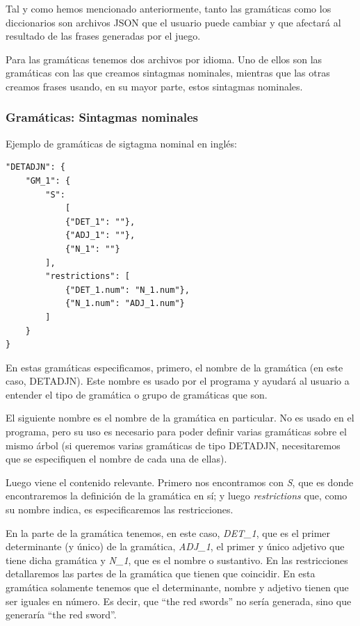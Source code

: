 Tal y como hemos mencionado anteriormente, tanto las gramáticas como los diccionarios son archivos JSON que el usuario puede cambiar y que afectará al resultado de las frases generadas por el juego.

Para las gramáticas tenemos dos archivos por idioma. Uno de ellos son las gramáticas con las que creamos sintagmas nominales, mientras que las otras creamos frases usando, en su mayor parte, estos sintagmas nominales.

\subsubsection{Gramáticas: Sintagmas nominales}

Ejemplo de gramáticas de sigtagma nominal en inglés:

\begin{lstlisting}[style=json]
"DETADJN": {
    "GM_1": {
        "S": 
            [
            {"DET_1": ""}, 
            {"ADJ_1": ""}, 
            {"N_1": ""}
        ],
        "restrictions": [
            {"DET_1.num": "N_1.num"},
            {"N_1.num": "ADJ_1.num"}
        ]
    }
}
\end{lstlisting}

En estas gramáticas especificamos, primero, el nombre de la gramática (en este caso, DETADJN). Este nombre es usado por el programa y ayudará al usuario a entender el tipo de gramática o grupo de gramáticas que son.

El siguiente nombre es el nombre de la gramática en particular. No es usado en el programa, pero su uso es necesario para poder definir varias gramáticas sobre el mismo árbol (si queremos varias gramáticas de tipo DETADJN, necesitaremos que se especifiquen el nombre de cada una de ellas).

Luego viene el contenido relevante. Primero nos encontramos con \textit{S}, que es donde encontraremos la definición de la gramática en sí; y luego \textit{restrictions} que, como su nombre indica, es especificaremos las restricciones.

En la parte de la gramática tenemos, en este caso, \textit{DET\_1}, que es el primer determinante (y único) de la gramática, \textit{ADJ\_1}, el primer y único adjetivo que tiene dicha gramática y \textit{N\_1}, que es el nombre o sustantivo.
En las restricciones detallaremos las partes de la gramática que tienen que coincidir. En esta gramática solamente tenemos que el determinante, nombre y adjetivo tienen que ser iguales en número. Es decir, que ``the red swords'' no sería generada, sino que generaría ``the red sword''.

